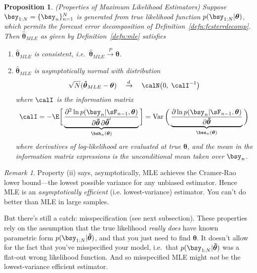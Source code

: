 \documentclass[12pt]{article}
\theoremstyle{plain}
\newtheorem{prop}[thm]{Proposition}
\theoremstyle{definition}
\theoremstyle{remark}
\newtheorem*{rmk}{Remark}
\newcommand{\bstheta}{\boldsymbol{\theta}}
\newcommand{\bshattheta}{\boldsymbol{\hat{\theta}}}
\newcommand{\bstildetheta}{\boldsymbol{\tilde{\theta}}}
\newcommand{\Var}{\operatorname{Var}}
\newcommand{\pto}{\xrightarrow{P}}
\newcommand{\dto}{\xrightarrow{d}}
\newcommand{\nN}{_{n=1}^N}
\begin{document}
\clearpage
\begin{prop}\emph{(Properties of Maximum Likelihood Estimators)}
\label{prop:mle}
Suppose $\bsy_{1:N}=\{\bsy_n\}\nN$ is generated from true
likelihood function $p(\bsy_{1:N}|\bstheta)$, which permits the forecast
error decomposition of Definition~\ref{defn:fcsterrdecomp}.
Then $\bshattheta_{MLE}$ as given by Definition~\ref{defn:mle} satisfies
\begin{enumerate}[label=\emph{(\roman*)}]
  \item $\bshattheta_{MLE}$ is consistent, i.e.\
    $\bshattheta_{MLE}\pto\bstheta$.
  \item $\bshattheta_{MLE}$ is asymptotically normal with distribution
    \begin{align*}
      \sqrt{N}(\bshattheta_{MLE}-\bstheta)
      \quad\dto\quad
      \calN\big(0,\;
      \calI^{-1}
      \big)
    \end{align*}
    where $\calI$ is the information matrix
    \begin{align*}
      \calI
      = -\E\bigg[
        \underbrace{
        \frac{\partial^2 \ln p(\bsy_n|\sF_{n-1},\bstheta)}{%
          \partial \bstildetheta \,\partial \bstildetheta'}
        }_{\bsh_n(\bstheta)}
        \bigg]
      = \Var\bigg(
        \underbrace{%
          \frac{\partial \ln p(\bsy_n|\sF_{n-1},\bstheta)}{%
            \partial \bstildetheta}
        }_{\bss_n(\bstheta)}
        \bigg)
    \end{align*}
    where derivatives of log-likelihood are evaluated at true
    $\bstheta$, and the mean in the information matrix expressions is
    the \emph{unconditional} mean taken over $\bsy_n$.
\end{enumerate}
\end{prop}
\begin{rmk}
Property (ii) says, asymptotically, MLE achieves the Cramer-Rao
lower bound---the lowest possible variance for any unbiased estimator.
Hence MLE is an \emph{asymptotically efficient} (i.e. lowest-variance)
estimator. You can't do better than MLE in large samples.

But there's still a catch: misspecification (see next subsection).
These properties rely on the assumption that the true likelihood
\emph{really does} have known parametric form
$p(\bsy_{1:N}|\bstildetheta)$, and that you just need to find
$\bstheta$. It doesn't allow for the fact that you've misspecified your
model, i.e.\ that $p(\bsy_{1:N}|\bstildetheta)$ was a flat-out wrong
likelihood function.  And so misspecified MLE might
\emph{not} be the lowest-variance efficient estimator.
\end{rmk}
\end{document}
